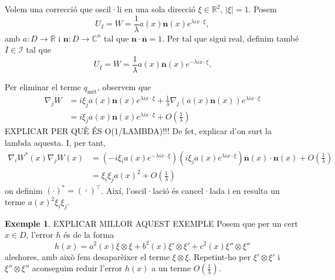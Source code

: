 \documentclass[11pt,a4paper,openright,oneside]{book}
\numberwithin{equation}{section}
\theoremstyle{definition}
\newtheorem{ex}[teo]{Exemple}
\begin{document}
Volem una correcció que oscil·li en una sola direcció $\xi\in\mathbb R^2$, $|\xi|=1$. Posem
\begin{equation*}
    U_I = W = \frac1\lambda a(x)\textbf{n}(x)e^{\lambda i x \cdot \xi},
\end{equation*}
amb $a:D\to\mathbb R$ i $\textbf{n}:D\to\mathbb C^n$ tal que $\textbf{n}\cdot \overline{\textbf{n}}=1$. Per tal que sigui real, definim també $\overline I\in\mathcal I$ tal que 
\begin{equation*}
    U_{\overline{I}} = \overline W = \frac1\lambda a(x)\overline{\textbf{n}}(x)e^{-\lambda i x \cdot \xi}.
\end{equation*}

Per eliminar el terme $q_{\text{mèt}}$, observem que
\begin{equation*}
    \begin{aligned}
    \nabla_j W &= i\xi_j a(x)\textbf{n}(x)e^{\lambda i x \cdot \xi} + \frac{1}{\lambda}\nabla_j (a(x)\textbf{n}(x))e^{\lambda i x \cdot \xi}\\
    &=i\xi_j a(x)\textbf{n}(x)e^{\lambda i x \cdot \xi} + O(\frac{1}{\lambda})
    \end{aligned}
\end{equation*}
{\color{blue} EXPLICAR PER QUÈ ÉS O(1/LAMBDA)!!! De fet, explicar d'on surt la lambda aquesta.}
I, per tant,
\begin{equation*}
    \begin{aligned}
    \nabla_i W^*(x) \nabla_jW(x)&= (-i\xi_ia(x)e^{-\lambda i x \cdot \xi})(i\xi_ja(x)e^{\lambda i x \cdot \xi})\overline{\textbf{n}}(x) \cdot\textbf{n}(x) + O(\frac{1}{\lambda})\\
    &= \xi_i\xi_j a(x)^2 + O(\frac{1}{\lambda})
    \end{aligned}
\end{equation*}
on definim $(\cdot)^* = (\overline{\cdot})^\intercal$. Així, l'oscil·lació és cancel·lada i en resulta un terme $a(x)^2\xi_i\xi_j$.
\begin{ex}
    {\color{blue} EXPLICAR MILLOR AQUEST EXEMPLE}
    Posem que per un cert $x\in D$, l'error $h$ és de la forma
    \begin{equation*}
        h(x) = a^2(x)\xi \otimes \xi + b^2(x)\xi' \otimes \xi' + c^2(x)\xi'' \otimes \xi''
    \end{equation*}
    aleshores, amb això fem desaparèixer el terme $\xi \otimes \xi$. Repetint-ho per $\xi' \otimes \xi'$ i $\xi'' \otimes \xi''$ aconseguim reduir l'error $h(x)$ a un terme $O(\frac{1}{\lambda})$.
\end{ex}
\end{document}
